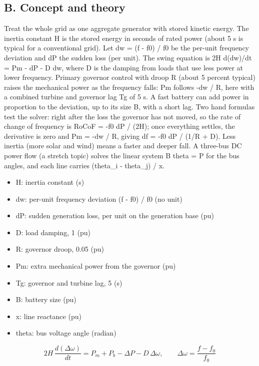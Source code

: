 \documentclass[11pt,a4paper]{article}
\begin{document}
\subsection*{B. Concept and theory}
Treat the whole grid as one aggregate generator with stored kinetic energy. The inertia constant H is the stored energy in seconds of rated power (about 5 s is typical for a conventional grid). Let dw = (f - f0) / f0 be the per-unit frequency deviation and dP the sudden loss (per unit). The swing equation is 2H d(dw)/dt = Pm - dP - D dw, where D is the damping from loads that use less power at lower frequency. Primary governor control with droop R (about 5 percent typical) raises the mechanical power as the frequency falls: Pm follows -dw / R, here with a combined turbine and governor lag Tg of 5 s. A fast battery can add power in proportion to the deviation, up to its size B, with a short lag. Two hand formulas test the solver: right after the loss the governor has not moved, so the rate of change of frequency is RoCoF = -f0 dP / (2H); once everything settles, the derivative is zero and Pm = -dw / R, giving df = -f0 dP / (1/R + D). Less inertia (more solar and wind) means a faster and deeper fall. A three-bus DC power flow (a stretch topic) solves the linear system B theta = P for the bus angles, and each line carries (theta\_i - theta\_j) / x.

\begin{itemize}[nosep]
\item H: inertia constant (s)
\item dw: per-unit frequency deviation (f - f0) / f0 (no unit)
\item dP: sudden generation loss, per unit on the generation base (pu)
\item D: load damping, 1 (pu)
\item R: governor droop, 0.05 (pu)
\item Pm: extra mechanical power from the governor (pu)
\item Tg: governor and turbine lag, 5 (s)
\item B: battery size (pu)
\item x: line reactance (pu)
\item theta: bus voltage angle (radian)
\end{itemize}

\begin{equation*}
2H\,\frac{d(\Delta\omega)}{dt} = P_m + P_b - \Delta P - D\,\Delta\omega,\qquad \Delta\omega=\frac{f-f_0}{f_0}
\end{equation*}
\end{document}
